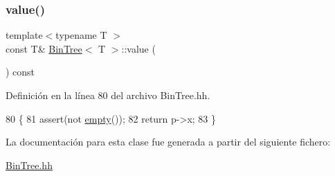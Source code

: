 \subsubsection{\texorpdfstring{value()}{value()}}
{\footnotesize\ttfamily template$<$typename T $>$ \\
const T\& \mbox{\hyperlink{class_bin_tree}{Bin\+Tree}}$<$ T $>$\+::value (\begin{DoxyParamCaption}{ }\end{DoxyParamCaption}) const}



Definición en la línea 80 del archivo Bin\+Tree.\+hh.


\begin{DoxyCode}
80                             \{
81         assert(not \mbox{\hyperlink{class_bin_tree_a74cda259ba5c25b8ee38ed4dc33e4fad}{empty}}());
82         \textcolor{keywordflow}{return} p->x;
83     \}
\end{DoxyCode}


La documentación para esta clase fue generada a partir del siguiente fichero\+:\begin{DoxyCompactItemize}
\item 
\mbox{\hyperlink{_bin_tree_8hh}{Bin\+Tree.\+hh}}\end{DoxyCompactItemize}
